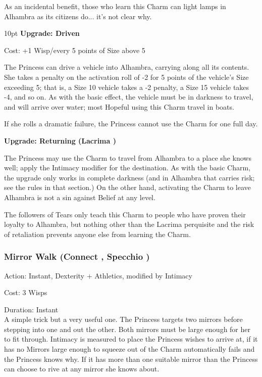 As an incidental benefit, those who learn this Charm can light lamps in Alhambra as its citizens do... it's not clear why. 

\begin{myindentpar}{10pt} \textbf{Upgrade: Driven}

\noindent Cost: +1 Wisp/every 5 points of Size above 5

The Princess can drive a vehicle into Alhambra, carrying along all its contents. She takes a penalty on the activation roll of -2 for 5 points of the vehicle's Size exceeding 5; that is, a Size 10 vehicle takes a -2 penalty, a Size 15 vehicle takes -4, and so on. As with the basic effect, the vehicle must be in darkness to travel, and will arrive over water; most Hopeful using this Charm travel in boats.

If she rolls a dramatic failure, the Princess cannot use the Charm for one full day.

\textbf{Upgrade: Returning (Lacrima \textbullet\textbullet\textbullet)}

The Princess may use the Charm to travel from Alhambra to a place she knows well; apply the Intimacy modifier for the destination. As with the basic Charm, the upgrade only works in complete darkness (and in Alhambra that carries risk; see the rules in that section.) On the other hand, activating the Charm to leave Alhambra is not a sin against Belief at any level.

The followers of Tears only teach this Charm to people who have proven their loyalty to Alhambra, but nothing other than the Lacrima perquisite and the risk of retaliation prevents anyone else from learning the Charm.\end{myindentpar}

\subsubsection*{Mirror Walk (Connect \textbullet\textbullet\textbullet\textbullet, Specchio \textbullet\textbullet)}

\noindent Action: Instant, Dexterity + Athletics, modified by Intimacy

\noindent Cost: 3 Wisps

\noindent Duration: Instant \\

A simple trick but a very useful one. The Princess targets two mirrors before stepping into one and out the other. Both mirrors must be large enough for her to fit through. Intimacy is measured to place the Princess wishes to arrive at, if it has no Mirrors large enough to squeeze out of the Charm automatically fails and the Princess knows why. If it has more than one suitable mirror than the Princess can choose to rive at any mirror she knows about.

